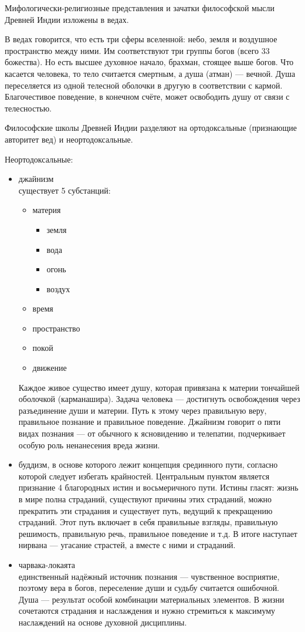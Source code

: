  Мифологически-религиозные представления и зачатки философской мысли Древней Индии изложены в ведах.

 В ведах говорится, что есть три сферы вселенной: небо, земля и воздушное пространство между ними. Им соответствуют три группы богов (всего 33 божества). Но есть высшее духовное начало, брахман, стоящее выше богов. Что касается человека, то тело считается смертным, а душа (атман) --- вечной. Душа переселяется из одной телесной оболочки в другую в соответствии с кармой. Благочестивое поведение, в конечном счёте, может освободить душу от связи с телесностью.

 Философские школы Древней Индии разделяют на ортодоксальные (признающие авторитет вед) и неортодоксальные.

 Неортодоксальные:
 \begin{itemize}
    \item джайнизм\\
    существует 5 субстанций:
    \begin{itemize}
        \item материя
        \begin{itemize}
            \item земля
            \item вода
            \item огонь
            \item воздух
        \end{itemize}
        \item время
        \item пространство
        \item покой
        \item движение
    \end{itemize}
    Каждое живое существо имеет душу, которая привязана к материи тончайшей оболочкой (карманашира). Задача человека --- достигнуть освобождения через разъединение души и материи. Путь к этому через правильную веру, правильное познание и правильное поведение. Джайнизм говорит о пяти видах познания --- от обычного к ясновидению и телепатии, подчеркивает особую роль ненанесения вреда жизни.
    \item буддизм, в основе которого лежит концепция срединного пути, согласно которой следует избегать крайностей. Центральным пунктом является признание 4 благородных истин и восьмеричного пути. Истины гласят: жизнь в мире полна страданий, существуют причины этих страданий, можно прекратить эти страдания и существует путь, ведущий к прекращению страданий. Этот путь включает в себя правильные взгляды, правильную решимость, правильную речь, правильное поведение и т.д. В итоге наступает нирвана --- угасание страстей, а вместе с ними и страданий.
    \item чарвака-локаята\\
    единственный надёжный источник познания --- чувственное восприятие, поэтому вера в богов, переселение души и судьбу считается ошибочной. Душа --- результат особой комбинации материальных элементов. В жизни сочетаются страдания и наслаждения и нужно стремиться к максимуму наслаждений на основе духовной дисциплины.
\end{itemize}
 
